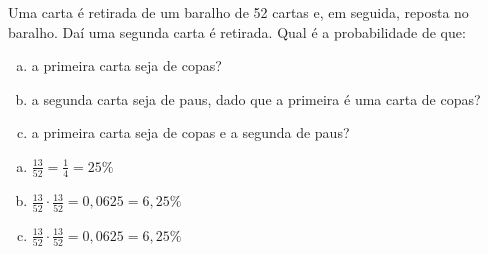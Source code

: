 \begin{ex}
Uma carta é retirada de um baralho de 52 cartas e, em seguida, reposta no baralho. Daí uma segunda carta é retirada. Qual é a probabilidade de que:
   \begin{enumerate}[(a)]
   \item a primeira carta seja de copas?
   \item a segunda carta seja de paus, dado que a primeira é uma carta de copas?
   \item a primeira carta seja de copas e a segunda de paus?
   \end{enumerate}
     \begin{sol}
      \phantom{A}
       \begin{enumerate} [(a)]
           \item $\frac{13}{52}=\frac{1}{4}=25\%$
           \item $\frac{13}{52}\cdot\frac{13}{52}=0,0625=6,25\%$
           \item $\frac{13}{52}\cdot\frac{13}{52}=0,0625=6,25\%$
       \end{enumerate}
     \end{sol}
\end{ex}